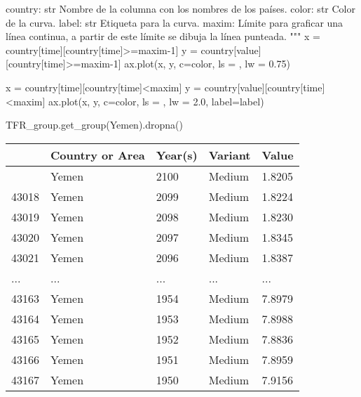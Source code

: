 \documentclass[
  letterpaper,
  DIV=11,
  numbers=noendperiod]{scrreprt}
\newenvironment{Shaded}{\begin{snugshade}}{\end{snugshade}}
\newcommand{\CommentTok}[1]{\textcolor[rgb]{0.37,0.37,0.37}{#1}}
\newcommand{\DecValTok}[1]{\textcolor[rgb]{0.68,0.00,0.00}{#1}}
\newcommand{\FloatTok}[1]{\textcolor[rgb]{0.68,0.00,0.00}{#1}}
\newcommand{\NormalTok}[1]{\textcolor[rgb]{0.00,0.23,0.31}{#1}}
\newcommand{\OperatorTok}[1]{\textcolor[rgb]{0.37,0.37,0.37}{#1}}
\newcommand{\StringTok}[1]{\textcolor[rgb]{0.13,0.47,0.30}{#1}}
\begin{document}
\begin{Shaded}
\begin{Highlighting}[]
\CommentTok{    country: str}
\CommentTok{        Nombre de la columna con los nombres de los países.}
\CommentTok{        }
\CommentTok{    color: str}
\CommentTok{        Color de la curva.}
\CommentTok{        }
\CommentTok{    label: str}
\CommentTok{        Etiqueta para la curva.}
\CommentTok{        }
\CommentTok{    maxim:}
\CommentTok{        Límite para graficar una línea continua, a partir de este}
\CommentTok{        límite se dibuja la línea punteada.}
\CommentTok{    """}   
\NormalTok{    x }\OperatorTok{=}\NormalTok{ country[time][country[time]}\OperatorTok{\textgreater{}=}\NormalTok{maxim}\OperatorTok{{-}}\DecValTok{1}\NormalTok{]}
\NormalTok{    y }\OperatorTok{=}\NormalTok{ country[value][country[time]}\OperatorTok{\textgreater{}=}\NormalTok{maxim}\OperatorTok{{-}}\DecValTok{1}\NormalTok{]}
\NormalTok{    ax.plot(x, y, c}\OperatorTok{=}\NormalTok{color, ls }\OperatorTok{=} \StringTok{\textquotesingle{}{-}{-}\textquotesingle{}}\NormalTok{, lw }\OperatorTok{=} \FloatTok{0.75}\NormalTok{)}

\NormalTok{    x }\OperatorTok{=}\NormalTok{ country[time][country[time]}\OperatorTok{\textless{}}\NormalTok{maxim]}
\NormalTok{    y }\OperatorTok{=}\NormalTok{ country[value][country[time]}\OperatorTok{\textless{}}\NormalTok{maxim]}
\NormalTok{    ax.plot(x, y, c}\OperatorTok{=}\NormalTok{color, ls }\OperatorTok{=} \StringTok{\textquotesingle{}{-}\textquotesingle{}}\NormalTok{, lw }\OperatorTok{=} \FloatTok{2.0}\NormalTok{, label}\OperatorTok{=}\NormalTok{label)}
        
\end{Highlighting}
\end{Shaded}

\begin{Shaded}
\begin{Highlighting}[]
\NormalTok{TFR\_group.get\_group(}\StringTok{\textquotesingle{}Yemen\textquotesingle{}}\NormalTok{).dropna()}
\end{Highlighting}
\end{Shaded}

\begin{longtable}[]{@{}lllll@{}}
\toprule\noalign{}
& Country or Area & Year(s) & Variant & Value \\
\midrule\noalign{}
\endhead
\bottomrule\noalign{}
\endlastfoot
43017 & Yemen & 2100 & Medium & 1.8205 \\
43018 & Yemen & 2099 & Medium & 1.8224 \\
43019 & Yemen & 2098 & Medium & 1.8230 \\
43020 & Yemen & 2097 & Medium & 1.8345 \\
43021 & Yemen & 2096 & Medium & 1.8387 \\
... & ... & ... & ... & ... \\
43163 & Yemen & 1954 & Medium & 7.8979 \\
43164 & Yemen & 1953 & Medium & 7.8988 \\
43165 & Yemen & 1952 & Medium & 7.8836 \\
43166 & Yemen & 1951 & Medium & 7.8959 \\
43167 & Yemen & 1950 & Medium & 7.9156 \\
\end{longtable}
\end{document}
